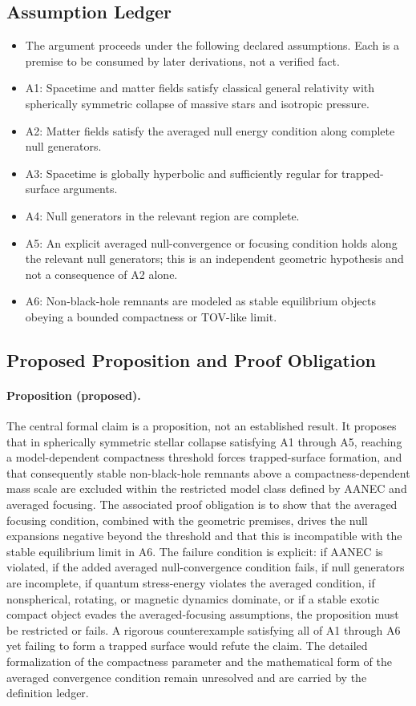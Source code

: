 \documentclass[conference]{IEEEtran}
\begin{document}
\subsection{Assumption Ledger}
\begin{itemize}
\item The argument proceeds under the following declared assumptions. Each is a premise to be consumed by later derivations, not a verified fact.
\item A1: Spacetime and matter fields satisfy classical general relativity with spherically symmetric collapse of massive stars and isotropic pressure.
\item A2: Matter fields satisfy the averaged null energy condition along complete null generators.
\item A3: Spacetime is globally hyperbolic and sufficiently regular for trapped-surface arguments.
\item A4: Null generators in the relevant region are complete.
\item A5: An explicit averaged null-convergence or focusing condition holds along the relevant null generators; this is an independent geometric hypothesis and not a consequence of A2 alone.
\item A6: Non-black-hole remnants are modeled as stable equilibrium objects obeying a bounded compactness or TOV-like limit.
\end{itemize}

\subsection{Proposed Proposition and Proof Obligation}
\paragraph{Proposition (proposed).} The central formal claim is a proposition, not an established result. It proposes that in spherically symmetric stellar collapse satisfying A1 through A5, reaching a model-dependent compactness threshold forces trapped-surface formation, and that consequently stable non-black-hole remnants above a compactness-dependent mass scale are excluded within the restricted model class defined by AANEC and averaged focusing. The associated proof obligation is to show that the averaged focusing condition, combined with the geometric premises, drives the null expansions negative beyond the threshold and that this is incompatible with the stable equilibrium limit in A6. The failure condition is explicit: if AANEC is violated, if the added averaged null-convergence condition fails, if null generators are incomplete, if quantum stress-energy violates the averaged condition, if nonspherical, rotating, or magnetic dynamics dominate, or if a stable exotic compact object evades the averaged-focusing assumptions, the proposition must be restricted or fails. A rigorous counterexample satisfying all of A1 through A6 yet failing to form a trapped surface would refute the claim. The detailed formalization of the compactness parameter and the mathematical form of the averaged convergence condition remain unresolved and are carried by the definition ledger.
\end{document}
